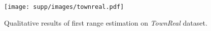 \begin{figure}[t]
\centering
\texttt{[image: supp/images/townreal.pdf]}

\caption{Qualitative results of first range estimation on \textit{TownReal} dataset.}
\label{fig:supp_townreal}

\end{figure}